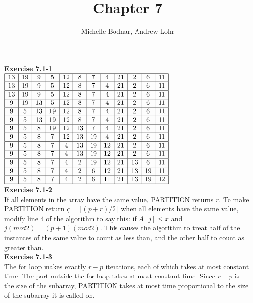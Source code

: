 \documentclass{article}
\title{Chapter 7}
\author{Michelle Bodnar, Andrew Lohr}
\begin{document}
\maketitle

\noindent\textbf{Exercise 7.1-1}\\

$
\begin{array}{|c|c|c|c|c|c|c|c|c|c|c|c|}
\hline
13&19&9&5&12&8&7&4&21&2&6&11\\
\hline
13&19&9&5&12&8&7&4&21&2&6&11\\
\hline
13&19&9&5&12&8&7&4&21&2&6&11\\
\hline
9&19&13&5&12&8&7&4&21&2&6&11\\
\hline
9&5&13&19&12&8&7&4&21&2&6&11\\
\hline
9&5&13&19&12&8&7&4&21&2&6&11\\
\hline
9&5&8&19&12&13&7&4&21&2&6&11\\
\hline
9&5&8&7&12&13&19&4&21&2&6&11\\
\hline
9&5&8&7&4&13&19&12&21&2&6&11\\
\hline
9&5&8&7&4&13&19&12&21&2&6&11\\
\hline
9&5&8&7&4&2&19&12&21&13&6&11\\
\hline
9&5&8&7&4&2&6&12&21&13&19&11\\
\hline
9&5&8&7&4&2&6&11&21&13&19&12\\
\hline
\end{array}
$
\\


\noindent\textbf{Exercise 7.1-2}\\

If all elements in the array have the same value, PARTITION returns $r$.  To make PARTITION return $q = \lfloor(p+r)/2\rfloor$ when all elements have the same value, modify line 4 of the algorithm to say this: if $A[j] \leq x$ and $j (mod 2) = (p+1) (mod 2)$.  This causes the algorithm to treat half of the instances of the same value to count as less than, and the other half to count as greater than. \\

\noindent\textbf{Exercise 7.1-3}\\

The for loop makes exactly $r-p$ iterations, each of which takes at most constant time. The part outside the for loop takes at most constant time. Since $r-p$ is the size of the subarray, PARTITION takes at most time proportional to the size of the subarray it is called on.\\
\end{document}
